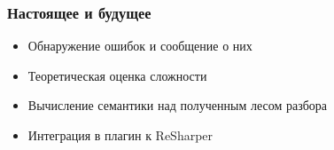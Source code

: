 \documentclass{beamer}
\begin{document}
\begin{frame}
  \transwipe[direction=90]
  \frametitle{Настоящее и будущее}
  \begin{itemize}
    \item Обнаружение ошибок и сообщение о них
    \item Теоретическая оценка сложности
    \item Вычисление семантики над полученным лесом разбора
    \item Интеграция в плагин к ReSharper
  \end{itemize}
\end{frame}
\end{document}
